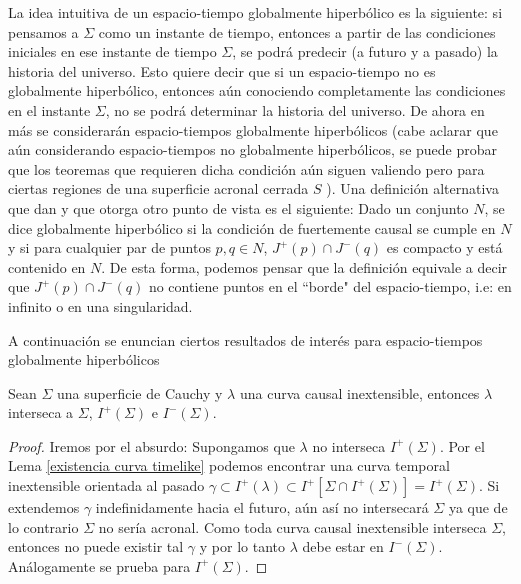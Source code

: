 La idea intuitiva de un espacio-tiempo globalmente hiperbólico es la siguiente: si pensamos a $\Sigma$ como un instante de tiempo, entonces a partir de las condiciones iniciales en ese instante de tiempo $\Sigma$, se podrá predecir (a futuro y a pasado) la historia del universo. Esto quiere decir que si un espacio-tiempo no es globalmente hiperbólico, entonces aún conociendo completamente las condiciones en el instante $\Sigma$, no se podrá determinar la historia del universo. De ahora en más se considerarán espacio-tiempos globalmente hiperbólicos (cabe aclarar que aún considerando espacio-tiempos no globalmente hiperbólicos, se puede probar que los teoremas que requieren dicha condición aún siguen valiendo pero para ciertas regiones de una superficie acronal cerrada $S$ \citep{1984ucp..book.....W}). Una definición alternativa que dan \citep{1975lsss.book.....H} y que otorga otro punto de vista es el siguiente: Dado un conjunto $N$, se dice globalmente hiperbólico si la condición de fuertemente causal se cumple en $N$ y si para cualquier par de puntos $p,q\in N$, $J^+(p) \cap J^-(q)$ es compacto y está contenido en $N$. De esta forma, podemos pensar que la definición equivale a decir que $J^+(p) \cap J^-(q)$ no contiene puntos en el ``borde" del espacio-tiempo, i.e: en infinito o en una singularidad.

A continuación se enuncian ciertos resultados de interés para espacio-tiempos globalmente hiperbólicos

\begin{proposition}\label{interseccion lambda}
Sean $\Sigma$ una superficie de Cauchy y $\lambda$ una curva causal inextensible, entonces $\lambda$ interseca a $\Sigma$, $I^+(\Sigma)$ e $I^-(\Sigma)$.
\end{proposition}
\begin{proof}
Iremos por el absurdo: Supongamos que $\lambda$ no interseca $I^+(\Sigma)$. Por el Lema \ref{existencia curva timelike} podemos encontrar una curva temporal inextensible orientada al pasado $\gamma \subset I^+(\lambda) \subset I^+[\Sigma\cap I^+(\Sigma)]=I^+(\Sigma)$. Si extendemos $\gamma$ indefinidamente hacia el futuro, aún así no intersecará $\Sigma$ ya que de lo contrario $\Sigma$ no sería acronal. Como toda curva causal inextensible interseca $\Sigma$, entonces no puede existir tal $\gamma$ y por lo tanto $\lambda$ debe estar en $I^-(\Sigma)$. Análogamente se prueba para $I^+(\Sigma)$.
\end{proof}

